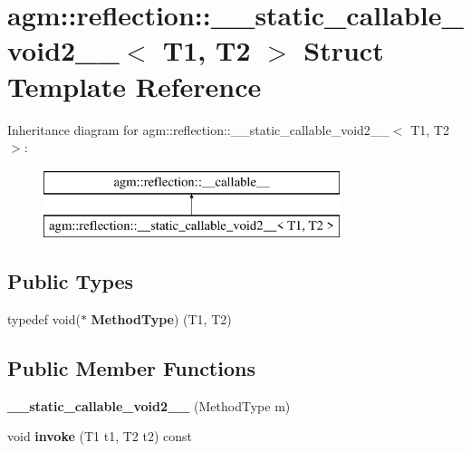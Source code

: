 \hypertarget{structagm_1_1reflection_1_1____static__callable__void2____}{}\section{agm\+:\+:reflection\+:\+:\+\_\+\+\_\+static\+\_\+callable\+\_\+void2\+\_\+\+\_\+$<$ T1, T2 $>$ Struct Template Reference}
\label{structagm_1_1reflection_1_1____static__callable__void2____}
Inheritance diagram for agm\+:\+:reflection\+:\+:\+\_\+\+\_\+static\+\_\+callable\+\_\+void2\+\_\+\+\_\+$<$ T1, T2 $>$\+:\begin{figure}[H]
\begin{center}
\leavevmode
\includegraphics[height=2.000000cm]{structagm_1_1reflection_1_1____static__callable__void2____}
\end{center}
\end{figure}
\subsection*{Public Types}
\begin{DoxyCompactItemize}
\item 
typedef void($\ast$ {\bfseries Method\+Type}) (T1, T2)\hypertarget{structagm_1_1reflection_1_1____static__callable__void2_____ac8edb20ac04a9fc5a2fb593901dc3b0d}{}\label{structagm_1_1reflection_1_1____static__callable__void2_____ac8edb20ac04a9fc5a2fb593901dc3b0d}

\end{DoxyCompactItemize}
\subsection*{Public Member Functions}
\begin{DoxyCompactItemize}
\item 
{\bfseries \+\_\+\+\_\+static\+\_\+callable\+\_\+void2\+\_\+\+\_\+} (Method\+Type m)\hypertarget{structagm_1_1reflection_1_1____static__callable__void2_____abd34afc9cc7945c89add2008516ab29e}{}\label{structagm_1_1reflection_1_1____static__callable__void2_____abd34afc9cc7945c89add2008516ab29e}

\item 
void {\bfseries invoke} (T1 t1, T2 t2) const \hypertarget{structagm_1_1reflection_1_1____static__callable__void2_____ae52f96efe518b6aff097d20e06992169}{}\label{structagm_1_1reflection_1_1____static__callable__void2_____ae52f96efe518b6aff097d20e06992169}

\end{DoxyCompactItemize}
